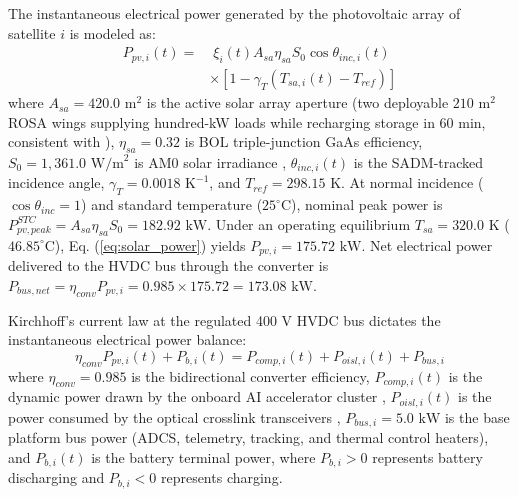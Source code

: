 \documentclass[journal]{IEEEtran}
\begin{document}
The instantaneous electrical power generated by the photovoltaic array of satellite $i$ is modeled as:
\begin{equation}
\begin{split}
    P_{pv,i}(t) = & \; \xi_i(t) A_{sa} \eta_{sa} S_0 \cos \theta_{inc,i}(t) \\
    & \times [1 - \gamma_T (T_{sa,i}(t) - T_{ref})]
\end{split}
\label{eq:solar_power}
\end{equation}
where $A_{sa} = 420.0\text{ m}^2$ is the active solar array aperture (two deployable $210\text{ m}^2$ ROSA wings supplying hundred-kW loads while recharging storage in 60 min, consistent with \cite{turyshev2026orbital, patel2005spacecraft}), $\eta_{sa} = 0.32$ is BOL triple-junction GaAs efficiency, $S_0 = 1,361.0\text{ W/m}^2$ is AM0 solar irradiance \cite{kopp2011new}, $\theta_{inc,i}(t)$ is the SADM-tracked incidence angle, $\gamma_T = 0.0018\text{ K}^{-1}$, and $T_{ref} = 298.15\text{ K}$. At normal incidence ($\cos \theta_{inc} = 1$) and standard temperature ($25^\circ\text{C}$), nominal peak power is $P_{pv,peak}^{STC} = A_{sa} \eta_{sa} S_0 = 182.92\text{ kW}$. Under an operating equilibrium $T_{sa} = 320.0\text{ K}$ ($46.85^\circ\text{C}$), Eq. (\ref{eq:solar_power}) yields $P_{pv,i} = 175.72\text{ kW}$. Net electrical power delivered to the HVDC bus through the converter is $P_{bus,net} = \eta_{conv} P_{pv,i} = 0.985 \times 175.72 = 173.08\text{ kW}$.

Kirchhoff's current law at the regulated 400 V HVDC bus dictates the instantaneous electrical power balance:
\begin{equation}
    \eta_{conv} P_{pv,i}(t) + P_{b,i}(t) = P_{comp,i}(t) + P_{oisl,i}(t) + P_{bus,i}
    \label{eq:bus_power_balance}
\end{equation}
where $\eta_{conv} = 0.985$ is the bidirectional converter efficiency, $P_{comp,i}(t)$ is the dynamic power drawn by the onboard AI accelerator cluster \cite{kim2025gpu, lentaris2018high}, $P_{oisl,i}(t)$ is the power consumed by the optical crosslink transceivers \cite{chaudhry2021laser}, $P_{bus,i} = 5.0\text{ kW}$ is the base platform bus power (ADCS, telemetry, tracking, and thermal control heaters), and $P_{b,i}(t)$ is the battery terminal power, where $P_{b,i} > 0$ represents battery discharging and $P_{b,i} < 0$ represents charging.
\end{document}
